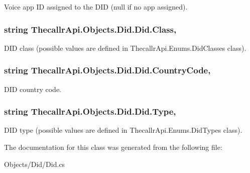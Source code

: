 Voice app I\+D assigned to the D\+I\+D (null if no app assigned). 

\hypertarget{class_thecallr_api_1_1_objects_1_1_did_1_1_did_a2e04ceee55d81776b998e3ecbe50de7d}{
\subsubsection[{Class}]{\setlength{\rightskip}{0pt plus 5cm}string Thecallr\+Api.\+Objects.\+Did.\+Did.\+Class\hspace{0.3cm}{\ttfamily [get]}, {\ttfamily [set]}}}\label{class_thecallr_api_1_1_objects_1_1_did_1_1_did_a2e04ceee55d81776b998e3ecbe50de7d}


D\+I\+D class (possible values are defined in Thecallr\+Api.\+Enums.\+Did\+Classes class). 

\hypertarget{class_thecallr_api_1_1_objects_1_1_did_1_1_did_ad7ac5466b3ef000462a712b9ab826204}{
\subsubsection[{Country\+Code}]{\setlength{\rightskip}{0pt plus 5cm}string Thecallr\+Api.\+Objects.\+Did.\+Did.\+Country\+Code\hspace{0.3cm}{\ttfamily [get]}, {\ttfamily [set]}}}\label{class_thecallr_api_1_1_objects_1_1_did_1_1_did_ad7ac5466b3ef000462a712b9ab826204}


D\+I\+D country code. 

\hypertarget{class_thecallr_api_1_1_objects_1_1_did_1_1_did_ad2c75fcb5993b346a96bb04b94f1f0e3}{
\subsubsection[{Type}]{\setlength{\rightskip}{0pt plus 5cm}string Thecallr\+Api.\+Objects.\+Did.\+Did.\+Type\hspace{0.3cm}{\ttfamily [get]}, {\ttfamily [set]}}}\label{class_thecallr_api_1_1_objects_1_1_did_1_1_did_ad2c75fcb5993b346a96bb04b94f1f0e3}


D\+I\+D type (possible values are defined in Thecallr\+Api.\+Enums.\+Did\+Types class). 



The documentation for this class was generated from the following file\+:\begin{DoxyCompactItemize}
\item 
Objects/\+Did/Did.\+cs\end{DoxyCompactItemize}
